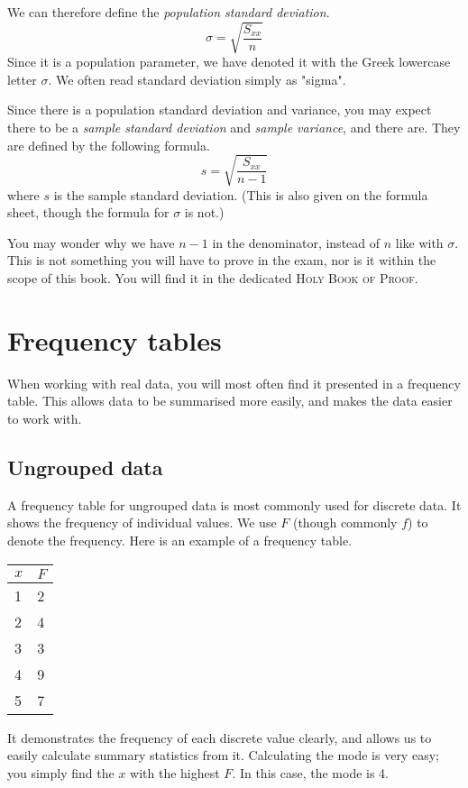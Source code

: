 We can therefore define the \textit{population standard deviation}. $$\sigma = \sqrt{\frac{S_{xx}}{n}}$$ Since it is a population parameter, we have denoted it with the Greek lowercase letter $\sigma$. We often read standard deviation simply as "sigma".

Since there is a population standard deviation and variance, you may expect there to be a \textit{sample standard deviation} and \textit{sample variance}, and there are. They are defined by the following formula. $$s = \sqrt{\frac{S_{xx}}{n-1}}$$ where $s$ is the sample standard deviation. (This is also given on the formula sheet, though the formula for $\sigma$ is not.) 

\begin{tcolorbox}
You may wonder why we have $n-1$ in the denominator, instead of $n$ like with $\sigma$. This is not something you will have to prove in the exam, nor is it within the scope of this book. You will find it in the dedicated \textsc{Holy Book of Proof}.
\end{tcolorbox}

\section{Frequency tables}

When working with real data, you will most often find it presented in a frequency table. This allows data to be summarised more easily, and makes the data easier to work with.

\subsection{Ungrouped data}

A frequency table for ungrouped data is most commonly used for discrete data. It shows the frequency of individual values. We use $F$ (though commonly $f$) to denote the frequency. Here is an example of a frequency table.
\begin{table}[H]
\centering
\begin{tabular}{l|l}
$x$ & $F$ \\ \hline
1   & 2   \\ \hline
2   & 4   \\ \hline
3   & 3   \\ \hline
4   & 9   \\ \hline
5   & 7  
\end{tabular}
\end{table}
It demonstrates the frequency of each discrete value clearly, and allows us to easily calculate summary statistics from it. Calculating the mode is very easy; you simply find the $x$ with the highest $F$. In this case, the mode is 4. 

